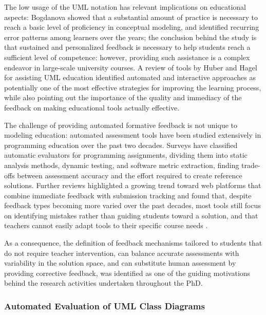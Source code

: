 The low usage of the UML notation has relevant implications on educational aspects: Bogdanova \cite{bogdanova2019towards} showed that a substantial amount of practice is necessary to reach a basic level of proficiency in conceptual modeling, and identified recurring error patterns among learners over the years; the conclusion behind the study is that sustained and personalized feedback is necessary to help students reach a sufficient level of competence: however, providing such assistance is a complex endeavor in large-scale university courses. A review of tools by Huber and Hagel \cite{huber2022tool} for assisting UML education identified automated and interactive approaches as potentially one of the most effective strategies for improving the learning process, while also pointing out the importance of the quality and immediacy of the feedback on making educational tools actually effective. 

The challenge of providing automated formative feedback is not unique to modeling education: automated assessment tools have been studied extensively in programming education over the past two decades. Surveys \cite{alamutka2005survey} have classified automatic evaluators for programming assignments, dividing them into static analysis methods, dynamic testing, and software metric extraction, finding trade-offs between assessment accuracy and the effort required to create reference solutions. Further reviews highlighted a growing trend toward web platforms that combine immediate feedback with submission tracking \cite{ihantola2010review} and found that, despite feedback types becoming more varied over the past decades, most tools still focus on identifying mistakes rather than guiding students toward a solution, and that teachers cannot easily adapt tools to their specific course needs \cite{keuning2019systematic}.

As a consequence, the definition of feedback mechanisms tailored to students that do not require teacher intervention, can balance accurate assessments with variability in the solution space, and can substitute human assessment by providing corrective feedback, was identified as one of the guiding motivations behind the research activities undertaken throughout the PhD.


\subsubsection{Automated Evaluation of UML Class Diagrams}
\label{sec:uml_eval}

